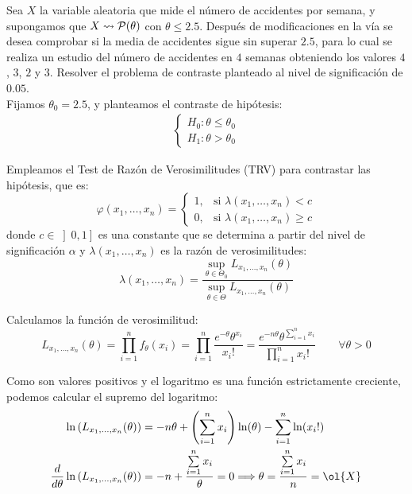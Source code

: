 \begin{ejemplo}
    Sea $X$ la variable aleatoria que mide el número de accidentes por semana, y supongamos que $X\rightsquigarrow \mathcal{P}(\theta)$ con $\theta \leq 2.5$. Después de modificaciones en la vía se desea comprobar si la media de accidentes sigue sin superar $2.5$, para lo cual se realiza un estudio del número de accidentes en $4$ semanas obteniendo los valores $4$, $3$, $2$ y $3$. Resolver el problema de contraste planteado al nivel de significación de $0.05$.\\

    Fijamos $\theta_0 = 2.5$, y planteamos el contraste de hipótesis:
    \begin{align*}
        \begin{cases}
        H_0: \theta \leq \theta_0 \\
        H_1: \theta > \theta_0
        \end{cases}
    \end{align*}

    Empleamos el Test de Razón de Verosimilitudes (TRV) para contrastar las hipótesis, que es:
    \begin{equation*}
        \varphi(x_1, \dots, x_n) =
        \begin{cases}
            1, & \text{si } \lambda(x_1, \dots, x_n) < c \\
            0, & \text{si } \lambda(x_1, \dots, x_n) \geq c
        \end{cases}
    \end{equation*}
    donde $c\in \left]0,1\right]$ es una constante que se determina a partir del nivel de significación $\alpha$ y $\lambda(x_1, \dots, x_n)$ es la razón de verosimilitudes:
    \begin{equation*}
        \lambda(x_1, \dots, x_n) = \frac{\sup\limits_{\theta\in\Theta_0} L_{x_1, \dots, x_n}(\theta)}{\sup\limits_{\theta\in\Theta} L_{x_1, \dots, x_n}(\theta)}
    \end{equation*}

    Calculamos la función de verosimilitud:
    \begin{equation*}
        L_{x_1, \dots, x_n}(\theta) = \prod\limits_{i=1}^{n} f_\theta(x_i) = \prod\limits_{i=1}^{n} \frac{e^{-\theta}\theta^{x_i}}{x_i!} = \frac{e^{-n\theta}\theta^{\sum\limits_{i=1}^{n} x_i}}{\prod\limits_{i=1}^{n} x_i!}\qquad \forall \theta > 0
    \end{equation*}

    Como son valores positivos y el logaritmo es una función estrictamente creciente, podemos calcular el supremo del logaritmo:
    \begin{align*}
        \ln \left(L_{x_1, \dots, x_n}(\theta)\right) &= -n\theta + \left(\sum\limits_{i=1}^{n} x_i\right)\ln(\theta) - \sum\limits_{i=1}^{n} \ln(x_i!) \\
        \frac{d}{d\theta} \ln \left(L_{x_1, \dots, x_n}(\theta)\right) &= -n + \frac{\sum\limits_{i=1}^{n} x_i}{\theta} = 0 \Longrightarrow \theta = \frac{\sum\limits_{i=1}^{n} x_i}{n} = \ol{X}
    \end{align*}


\end{ejemplo}
